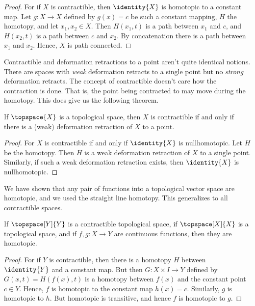         \begin{proof}
            For if $X$ is contractible, then $\identity{X}$ is homotopic
            to a constant map. Let $g:X\rightarrow{X}$ defined by
            $g(x)=c$ be such a constant mapping, $H$ the homotopy, and
            let $x_{1},x_{2}\in{X}$. Then $H(x_{1},t)$ is a path between
            $x_{1}$ and $c$, and $H(x_{2},t)$ is a path between
            $c$ and $x_{2}$. By concatenation there is a path between
            $x_{1}$ and $x_{2}$. Hence, $X$ is path connected.
        \end{proof}
        Contractible and deformation retractions to a point aren't quite
        identical notions. There are spaces with \textit{weak}
        deformation retracts to a single point but no \textit{strong}
        deformation retracts. The concept of contractible doesn't care
        how the contraction is done. That is, the point being contracted
        to may move during the homotopy. This does give us the following
        theorem.
        \begin{theorem}
            If $\topspace{X}$ is a topological space, then $X$ is
            contractible if and only if there is a (weak) deformation
            retraction of $X$ to a point.
        \end{theorem}
        \begin{proof}
            For $X$ is contractible if and only if $\identity{X}$ is
            nullhomotopic. Let $H$ be the homotopy. Then $H$ is a
            weak deformation retraction of $X$ to a single point.
            Similarly, if such a weak deformation retraction exists,
            then $\identity{X}$ is nullhomotopic.
        \end{proof}
        We have shown that any pair of functions into a topological
        vector space are homotopic, and we used the straight line
        homotopy. This generalizes to all contractible spaces.
        \begin{theorem}
            If $\topspace[Y]{Y}$ is a contractible topological space, if
            $\topspace[X]{X}$ is a topological space, and if
            $f,g:X\rightarrow{Y}$ are continuous functions, then they
            are homotopic.
        \end{theorem}
        \begin{proof}
            For if $Y$ is contractible, then there is a homotopy $H$
            between $\identity{Y}$ and a constant map. But then
            $G:X\times{I}\rightarrow{Y}$ defined by
            $G(x,t)=H(f(x),t)$ is a homotopy between $f(x)$ and the
            constant point $c\in{Y}$. Hence, $f$ is homotopic to the
            constant map $h(x)=c$. Similarly, $g$ is homotopic to $h$.
            But homotopic is transitive, and hence $f$ is homotopic to
            $g$.
        \end{proof}

